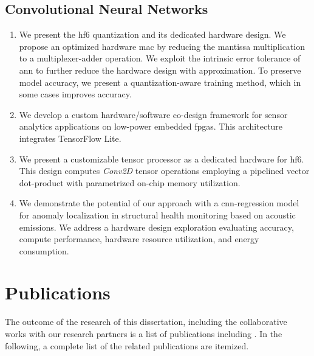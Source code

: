 \subsection{Convolutional Neural Networks}
\begin{enumerate}
	\item
	
	We present the \gls{hf6} quantization and its dedicated hardware design. We propose an optimized hardware \gls{mac} by reducing the mantissa multiplication to a multiplexer-adder operation. We exploit the intrinsic error tolerance of \gls{ann} to further reduce the hardware design with approximation. To preserve model accuracy, we present a quantization-aware training method, which in some cases improves accuracy.
	
	\item We develop a custom hardware/software co-design framework for sensor analytics applications on low-power embedded \glspl{fpga}. This architecture integrates TensorFlow Lite.
	\item We present a customizable tensor processor as a dedicated hardware for \gls{hf6}. This design computes \emph{Conv2D} tensor operations employing a pipelined vector dot-product with parametrized on-chip memory utilization.
	\item We demonstrate the potential of our approach with a \gls{cnn}-regression model for anomaly localization in structural health monitoring based on acoustic emissions. We address a hardware design exploration evaluating accuracy, compute performance, hardware resource utilization, and energy consumption.
\end{enumerate}

\section{Publications}
The outcome of the research of this dissertation, including the collaborative works with our research partners is a list of publications including \cite{nevarez2020accelerator, nevarez2021accelerating, yu2020taac}. In the following, a complete list of the related publications are itemized.

